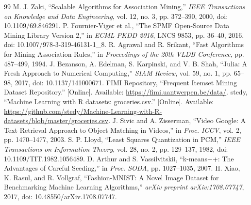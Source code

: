 \begin{thebibliography}{99}
 M. J. Zaki, ``Scalable Algorithms for Association Mining,''
\emph{IEEE Transactions on Knowledge and Data Engineering}, vol. 12, no. 3,
pp. 372--390, 2000, doi: 10.1109/69.846291.
 P. Fournier-Viger et al., ``The SPMF Open-Source Data Mining
Library Version 2,'' in \emph{ECML PKDD 2016}, LNCS 9853, pp. 36--40, 2016,
doi: 10.1007/978-3-319-46131-1\_8.
 R. Agrawal and R. Srikant, ``Fast Algorithms for Mining
Association Rules,'' in \emph{Proceedings of the 20th VLDB Conference},
pp. 487--499, 1994.
 J. Bezanson, A. Edelman, S. Karpinski, and V. B. Shah,
``Julia: A Fresh Approach to Numerical Computing,'' \emph{SIAM Review},
vol. 59, no. 1, pp. 65--98, 2017, doi: 10.1137/141000671.
 FIMI Repository, ``Frequent Itemset Mining Dataset Repository.''
[Online]. Available: \url{https://fimi.uantwerpen.be/data/}.
 stedy, ``Machine Learning with R datasets: groceries.csv.''
[Online]. Available: \url{https://github.com/stedy/Machine-Learning-with-R-datasets/blob/master/groceries.csv}.
 J. Sivic and A. Zisserman, ``Video Google: A Text Retrieval
Approach to Object Matching in Videos,'' in \emph{Proc. ICCV}, vol. 2,
pp. 1470--1477, 2003.
 S. P. Lloyd, ``Least Squares Quantization in PCM,''
\emph{IEEE Transactions on Information Theory}, vol. 28, no. 2,
pp. 129--137, 1982, doi: 10.1109/TIT.1982.1056489.
 D. Arthur and S. Vassilvitskii, ``k-means++: The Advantages of
Careful Seeding,'' in \emph{Proc. SODA}, pp. 1027--1035, 2007.
 H. Xiao, K. Rasul, and R. Vollgraf, ``Fashion-MNIST: A
Novel Image Dataset for Benchmarking Machine Learning Algorithms,''
\emph{arXiv preprint arXiv:1708.07747}, 2017,
doi: 10.48550/arXiv.1708.07747.
\end{thebibliography}
